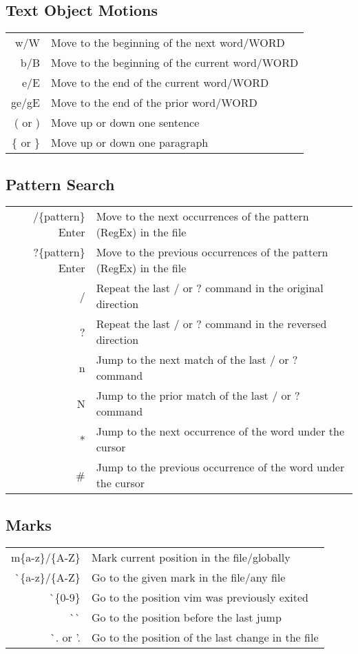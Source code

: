 \documentclass{article}
\begin{document}
\subsection{Text Object Motions}
\begin{tabular}{ r l }
 w/W & Move to the beginning of the next word/WORD \\  [0.5ex]
 b/B & Move to the beginning of the current word/WORD\\  [0.5ex]
 e/E & Move to the end of the current word/WORD\\  [0.5ex]
 ge/gE & Move to the end of the prior word/WORD\\  [0.5ex]
 ( or ) & Move up or down one sentence \\[0.5ex]
 \{ or \} & Move up or down one paragraph \\[0.5ex]
\end{tabular}

\subsection{Pattern Search}
\begin{tabular}{ r l }
 /\{pattern\} Enter& Move to the next occurrences of the pattern (RegEx) in the file\\[0.5ex]
 ?\{pattern\} Enter& Move to the previous occurrences of the pattern (RegEx) in the file\\[0.5ex]
 / & Repeat the last / or ? command in the original direction\\[0.5ex]
 ? & Repeat the last / or ? command in the reversed direction\\[0.5ex]
 n & Jump to the next match of the last / or ? command\\[0.5ex]
 N & Jump to the prior match of the last / or ? command\\[0.5ex]
 * & Jump to the next occurrence of the word under the cursor\\[0.5ex]
 \# & Jump to the previous occurrence of the word under the cursor\\[0.5ex]
\end{tabular}

\subsection{Marks}

\begin{tabular}{r l}
 m\{a-z\}/\{A-Z\} & Mark current position in the file/globally\\[0.5ex]
 \`{}\{a-z\}/\{A-Z\} & Go to the given mark in the file/any file\\[0.5ex]
 \`{}\{0-9\} & Go to the position vim was previously exited\\[0.5ex]
 \`{}\`{} & Go to the position before the last jump\\[0.5ex]
 \`{}. or '.& Go to the position of the last change in the file\\[0.5ex]
\end{tabular}
 
\end{document}
